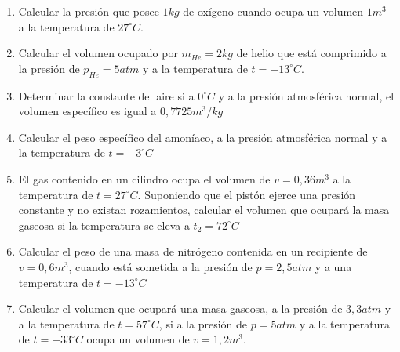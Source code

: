 \documentclass[../main]{subfiles}
\begin{document}
\begin{enumerate}
    Si el aire experimentado en el problema anterior fuera tratado
    como un gas ideal, ¿cuál sería la masa molecular media del gas?
    (ayuda: Usa la ley de los gases ideales)
  \item Calcular la presión que posee $1kg$ de oxígeno cuando ocupa
    un volumen $1m^3$ a la temperatura de $27^\circ C$.
  \item Calcular el volumen ocupado por $m_{He}=2kg$ de helio que
    está comprimido a la presión de $p_{He}=5atm$ y a la temperatura
    de $t=-13^\circ C$.
  \item Determinar la constante del aire si a $0^\circ C$ y a la
    presión atmosférica normal, el volumen específico es igual a $0,7725 m^3/kg$
  \item Calcular el peso específico del amoníaco, a la presión
    atmosférica normal y a la temperatura de $t=-3^\circ C$
  \item El gas contenido en un cilindro ocupa el volumen de
    $v=0,36m^3$ a la temperatura de $t=27^\circ C$. Suponiendo que el
    pistón ejerce una presión constante y no existan rozamientos,
    calcular el volumen que ocupará la masa gaseosa si la temperatura
    se eleva a $t_2=72^\circ C$
  \item Calcular el peso de una masa de nitrógeno contenida en un
    recipiente de $v=0,6m^3$, cuando está sometida a la presión de
    $p=2,5atm$ y a una temperatura de $t=-13^\circ C$
  \item Calcular el volumen que ocupará una masa gaseosa, a la
    presión de $3,3atm$ y a la temperatura de $t=57^\circ C$, si a la
    presión de $p=5atm$ y a la temperatura de $t=-33^\circ C$ ocupa
    un volumen de $v=1,2m^3$.

\end{enumerate}
\end{document}
